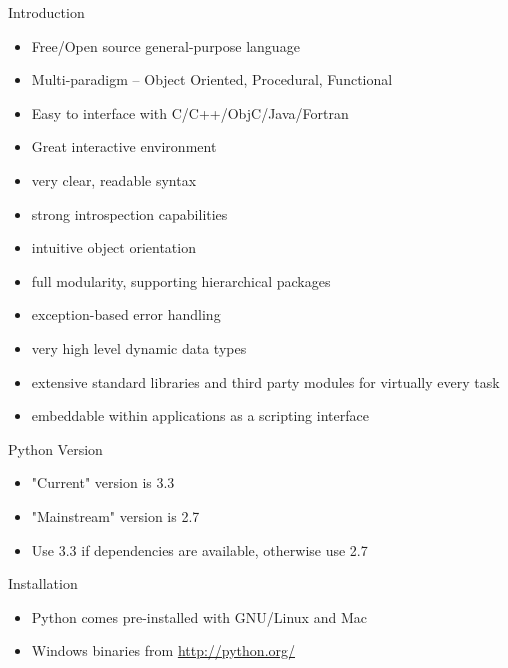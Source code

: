 \documentclass[12pt,handout]{beamer}
\begin{document}
\begin{frame}{Introduction}

\begin{itemize}
\item Free/Open source general-purpose language
\item Multi-paradigm -- Object Oriented, Procedural, Functional
\item Easy to interface with C/C++/ObjC/Java/Fortran
\item Great interactive environment
\item very clear, readable syntax
\item strong introspection capabilities
\item intuitive object orientation
\item full modularity, supporting hierarchical packages
\item exception-based error handling
\item very high level dynamic data types
\item extensive standard libraries and third party modules for virtually every task
\item embeddable within applications as a scripting interface

\end{itemize}
\end{frame}

\begin{frame}{Python Version}

\begin{itemize}
\item "Current" version is 3.3
\item "Mainstream" version is 2.7
\item Use 3.3 if dependencies are available, otherwise use 2.7

\end{itemize}
\end{frame}

\begin{frame}{Installation}

\begin{itemize}
\item Python comes pre-installed with GNU/Linux and Mac
\item Windows binaries from \url{http://python.org/}

\end{itemize}
\end{frame}
\end{document}
